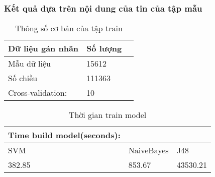 	\subsubsection{Kết quả dựa trên nội dung của tin của tập mẫu}
	\begin{table}[H]
		\centering
		\setlength\extrarowheight{3pt}
		\begin{tabular}{|l|l|l|}
			\hline
			Dữ liệu gán nhãn & Số lượng \\
			\hline
			Mẫu dữ liệu   & 15612\\
			\hline
			Số chiều   & 111363\\
			\hline
			Cross-validation:   & 10\\
			\hline
		\end{tabular}%
		\caption{Thông số cơ bản của tập train} \label{tab:table_4_3}%
	\end{table}
	\begin{table}[H]
		\centering
		\begin{tabular}{|l|l|l|}
			\hline
			Time build model(seconds): &            &          \\
			\hline
			SVM                        & NaiveBayes & J48      \\
			\hline
			382.85                     & 853.67     & 43530.21 \\
			\hline
		\end{tabular}
		\caption{Thời gian train model}
		\label{tab:table_4_4}
	\end{table}
	\begin{table}[H]
	\centering
	\caption{Kết quả train model dựa trên một số độ đo}
	\label{tab:table_4_5}
	\end{table}%
